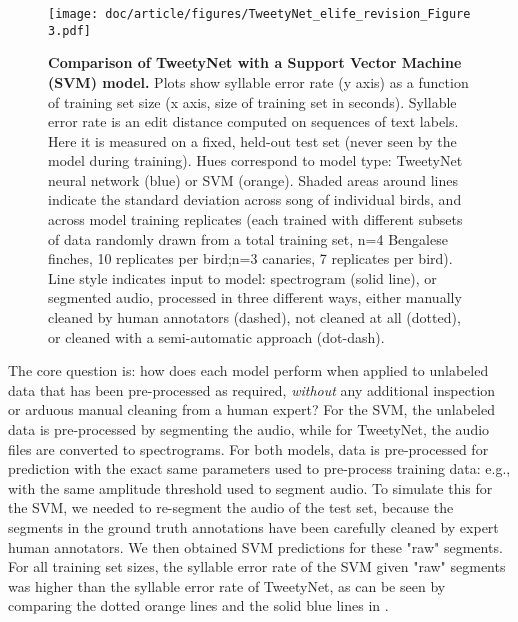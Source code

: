 \documentclass[9pt,lineno]{elife}
\begin{document}
\begin{figure}[!ht] %
\texttt{[image: doc/article/figures/TweetyNet\_elife\_revision\_Figure 3.pdf]}
\caption{{\bf Comparison of TweetyNet with a Support Vector Machine (SVM) model.}
Plots show syllable error rate (y axis) 
as a function of training set size (x axis, size of training set in seconds). 
Syllable error rate is an edit distance computed on sequences of text labels. 
Here it is measured on a fixed, held-out test set 
(never seen by the model during training).
Hues correspond to model type: 
TweetyNet neural network (blue) or SVM (orange). Shaded areas around lines indicate 
the standard deviation across song of individual birds, and across model training replicates 
(each trained with different subsets of data randomly drawn from a total training set, 
n=4 Bengalese finches, 10 replicates per bird;n=3 canaries, 7 replicates per bird). 
Line style indicates input to model: 
spectrogram (solid line), or segmented audio, processed in three 
different ways, either manually cleaned by human annotators (dashed), 
not cleaned at all (dotted), 
or cleaned with a semi-automatic approach (dot-dash).
}
\label{fig:tweetynet-vs-svm}
\label{figdata:first}
\end{figure}

The core question is: how does each model perform when applied to unlabeled data 
that has been pre-processed as required, 
\textit{without} any additional inspection or arduous manual cleaning from a human expert?
For the SVM, the unlabeled data is pre-processed by segmenting the audio, 
while for TweetyNet, the audio files are converted to spectrograms. 
For both models, data is pre-processed for prediction 
with the exact same parameters used to pre-process training data: 
e.g., with the same amplitude threshold used to segment audio.
To simulate this for the SVM, we needed to re-segment the audio of the test set, 
because the segments in the ground truth annotations have been carefully cleaned by expert human annotators. 
We then obtained SVM predictions for these "raw" segments. 
For all training set sizes, the syllable error rate 
of the SVM given "raw" segments was higher than the syllable error rate of TweetyNet, 
as can be seen by comparing the dotted orange lines and the solid blue lines in .
\end{document}
